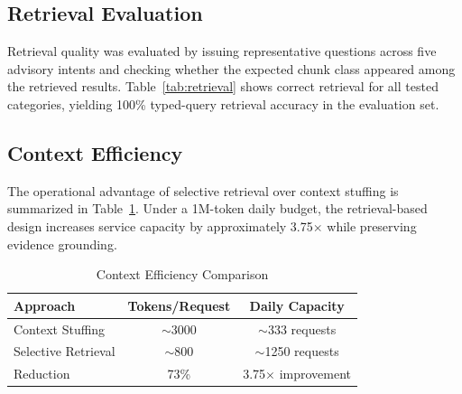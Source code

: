 \documentclass[conference]{IEEEtran}
\begin{document}
\subsection{Retrieval Evaluation}
Retrieval quality was evaluated by issuing representative questions across five advisory intents and checking whether the expected chunk class appeared among the retrieved results. Table~\ref{tab:retrieval} shows correct retrieval for all tested categories, yielding 100\% typed-query retrieval accuracy in the evaluation set.

\begin{table}[t]
\caption{Retrieval Evaluation}
\label{tab:retrieval}
\centering
{}
\end{table}

\subsection{Context Efficiency}
The operational advantage of selective retrieval over context stuffing is summarized in Table~\ref{tab:tokens}. Under a 1M-token daily budget, the retrieval-based design increases service capacity by approximately 3.75$\times$ while preserving evidence grounding.

\begin{table}[t]
\caption{Context Efficiency Comparison}
\label{tab:tokens}
\centering
\begin{tabular}{lcc}
\toprule
Approach & Tokens/Request & Daily Capacity \\
\midrule
Context Stuffing & $\sim$3000 & $\sim$333 requests \\
Selective Retrieval & $\sim$800 & $\sim$1250 requests \\
Reduction & 73\% & 3.75$\times$ improvement \\
\bottomrule
\end{tabular}
\end{table}
\end{document}
